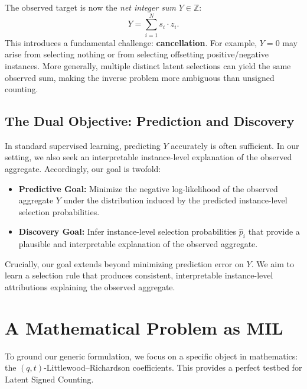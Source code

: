 \documentclass{article}
\theoremstyle{plain}
\theoremstyle{definition}
\theoremstyle{remark}
\begin{document}
The observed target is now the \textit{net integer sum} $Y \in \mathbb{Z}$:
\[
    Y = \sum_{i=1}^N s_i \cdot z_i.
\]
This introduces a fundamental challenge: \textbf{cancellation}. For example, $Y=0$ may arise from selecting nothing or from selecting offsetting positive/negative instances. More generally, multiple distinct latent selections can yield the same observed sum, making the inverse problem more ambiguous than unsigned counting.

    
\subsection{The Dual Objective: Prediction and Discovery}
In standard supervised learning, predicting $Y$ accurately is often sufficient. In our setting, we also seek an interpretable instance-level explanation of the observed aggregate. Accordingly, our goal is twofold:

\begin{itemize}
    \item \textbf{Predictive Goal:} Minimize the negative log-likelihood of the observed aggregate $Y$ under the distribution induced by the predicted instance-level selection probabilities.
    \item \textbf{Discovery Goal:} Infer instance-level selection probabilities $\hat{p}_i$ that provide a plausible and interpretable explanation of the observed aggregate.
\end{itemize}

Crucially, our goal extends beyond minimizing prediction error on $Y$. We aim to learn a selection rule that produces consistent, interpretable instance-level attributions explaining the observed aggregate.
	
	
	\section{A Mathematical Problem as MIL}
	\label{sec:background}
	
	To ground our generic formulation, we focus on a specific object in mathematics: the $(q,t)$-Littlewood--Richardson coefficients. This provides a perfect testbed for Latent Signed Counting.
	
\end{document}
